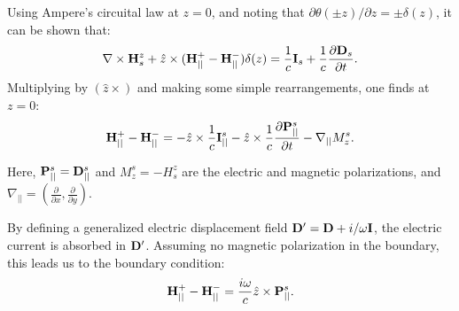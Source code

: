 \documentclass{article}
\begin{document}
	Using Ampere’s circuital law at $z = 0$, and noting that $\partial \theta(\pm z) / \partial z = \pm \delta(z)$, it can be shown that:
	\begin{equation}
		\nabla \times \vb{H}^{z}_s + \hat{z} \times (\vb{H}_{||}^{+} - \vb{H}_{||}^{-}) \delta(z) = \frac{1}{c} \vb{I}_s + \frac{1}{c} \frac{\partial \vb{D}_s}{\partial t}.
	\end{equation}
	Multiplying by $(\hat{z} \times)$ and making some simple rearrangements, one finds at $z=0$:
	\begin{equation}
		\vb{H}_{||}^{+} - \vb{H}_{||}^{-} = -\hat{z} \times \frac{1}{c} \vb{I}_{||}^s - \hat{z} \times \frac{1}{c} \frac{\partial \vb{P}_{||}^s}{\partial t} - \nabla_{||} M_{z}^s.
	\end{equation}
	
	Here, $\vb{P}_{||}^{s} = \vb{D}_{||}^{s}$ and $M_{z}^{s} = -H^{z}_{s}$ are the electric and magnetic polarizations, and $\nabla_{||} = \left(\frac{\partial}{\partial x}, \frac{\partial}{\partial y} \right)$. 
	
	By defining a generalized electric displacement field $\vb{D}' = \vb{D} + i/\omega \vb{I}$, the electric current is absorbed in $\vb{D}'$. Assuming no magnetic polarization in the boundary, this leads us to the boundary condition:
	\begin{equation}
		\vb{H}_{||}^{+} - \vb{H}_{||}^{-} = \frac{i \omega}{c} \hat{z} \times \vb{P}_{||}^{s}.
	\end{equation}
	
\end{document}

